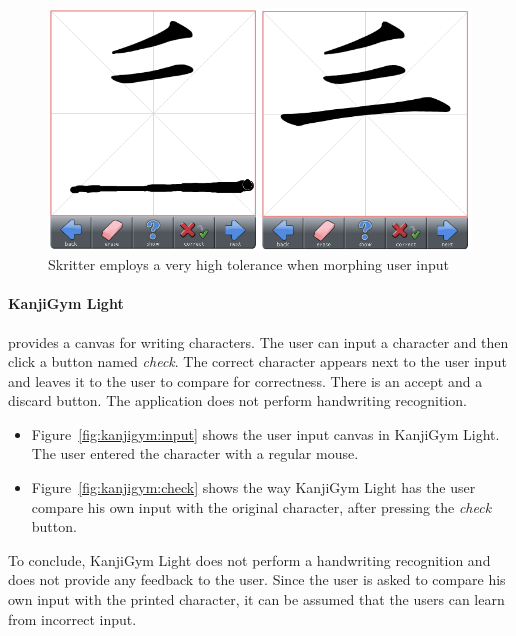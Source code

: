 \begin{figure}[htbp]
\begin{center}
\includegraphics[scale=0.6]{images/ConceptualDesign/skritter/highToleranceForMorphing.png}
\caption{Skritter employs a very high tolerance when morphing user input}
\label{fig:skritter:highToleranceForMorphing}
\end{center}
\end{figure}

\paragraph{KanjiGym Light} provides a canvas for writing characters. The user 
can input a character and then click a button named \emph{check}. The correct 
character appears next to the user input and leaves it to the user to compare 
for correctness. There is an accept and a discard button.
The application does not perform handwriting recognition. 
\begin{itemize}
\item Figure~\ref{fig:kanjigym:input} shows the user input canvas in 
      KanjiGym Light. The user entered the character with a regular mouse.
\item Figure~\ref{fig:kanjigym:check} shows the way KanjiGym Light has the 
      user compare his own input with the original character,
      after pressing the \emph{check} button.
\end{itemize}
To conclude, KanjiGym Light does not perform a handwriting recognition and
does not provide any feedback to the user.
Since the user is asked to compare his own input with the printed character,
it can be assumed that the users can learn from incorrect input.

